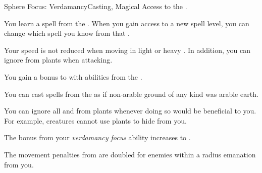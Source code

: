     \begin{feat}{Sphere Focus: Verdamancy}{Casting, Magical}
        \featpre Access to the  .

         You learn a spell from the  .
        When you gain access to a new spell level, you can change which spell you know from that .

         Your speed is not reduced when moving in light or heavy .
        In addition, you can ignore  from plants when attacking.

         You gain a  bonus to  with abilities from the  .

         You can cast spells from the   as if non-arable ground of any kind was arable earth.

         You can ignore all  and  from plants whenever doing so would be beneficial to you.
        For example, creatures cannot use plants to hide from you.

         The bonus from your \textit{verdamancy focus} ability increases to .

         The movement penalties from  are doubled for enemies within a \areahuge radius emanation from you.
    \end{feat}


